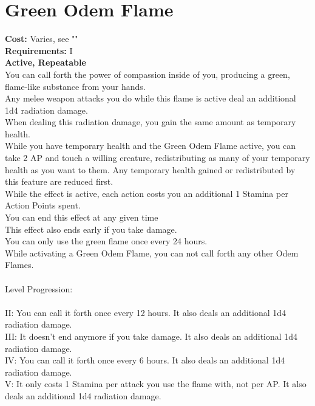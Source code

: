 \section{Green Odem Flame}\label{perk:greenOdemFlame}
\textbf{Cost:} Varies, see ""\\
\textbf{Requirements:} I\\
\textbf{Active, Repeatable}\\
You can call forth the power of compassion inside of you, producing a green, flame-like substance from your hands.\\
Any melee weapon attacks you do while this flame is active deal an additional 1d4 radiation damage.\\
When dealing this radiation damage, you gain the same amount as temporary health.\\
While you have temporary health and the Green Odem Flame active, you can take 2 AP and touch a willing creature, redistributing as many of your temporary health as you want to them.
Any temporary health gained or redistributed by this feature are reduced first.\\
While the effect is active, each action costs you an additional 1 Stamina per Action Points spent.\\
You can end this effect at any given time\\
This effect also ends early if you take damage.\\
You can only use the green flame once every 24 hours.\\
While activating a Green Odem Flame, you can not call forth any other Odem Flames.\\
\\
Level Progression:\\
\\
II: You can call it forth once every 12 hours.
It also deals an additional 1d4 radiation damage.\\
III: It doesn't end anymore if you take damage.
It also deals an additional 1d4 radiation damage.\\
IV: You can call it forth once every 6 hours.
It also deals an additional 1d4 radiation damage.\\
V: It only costs 1 Stamina per attack you use the flame with, not per AP.
It also deals an additional 1d4 radiation damage.\\